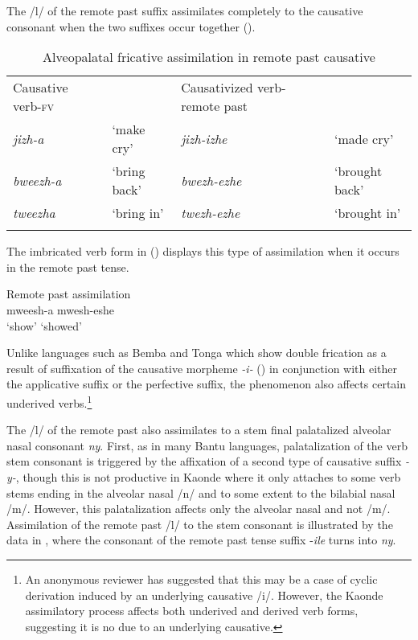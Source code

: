 \documentclass[output=paper]{langsci/langscibook}
\begin{document}
The /l/ of the remote past suffix assimilates completely to the causative consonant when the two suffixes occur together ().


\begin{table}
\begin{tabular}{llll}
\lsptoprule
Causative verb-\textsc{fv} &  & Causativized verb-remote past & \\
\textit{jizh-a} & `make cry' & \textit{jizh-izhe} & `made cry' \\
\textit{bweezh-a} & `bring back' & \textit{bwezh-ezhe} & `brought back' \\
\textit{tweezha} & `bring in' & \textit{twezh-ezhe} & `brought in' \\

\lspbottomrule
\end{tabular}

\caption{Alveopalatal fricative assimilation in remote past causative}
\label{tab:7.kawasha}

 \end{table}


The imbricated verb form in () displays this type of assimilation when it occurs in the remote past tense. 


\ea\label{ex:4.kawasha} Remote past assimilation \\
\gll mweesh-a mwesh-eshe\\
   ‘show’ ‘showed’\\
\glt 
\z


Unlike languages such as Bemba and Tonga which show double frication as a result of suffixation of the causative morpheme \textit{-i-} (\citealt{hyman1995,hyman2003}) in conjunction with either the applicative suffix or the perfective suffix, the phenomenon also affects certain underived verbs.\footnote{An anonymous reviewer has suggested that this may be a case of cyclic derivation induced by an underlying causative /i/. However, the Kaonde assimilatory process affects both underived and derived verb forms, suggesting it is no due to an underlying causative.}

 
The /l/ of the remote past also assimilates to a stem final palatalized alveolar nasal consonant \textit{ny}. First, as in many Bantu languages, palatalization of the verb stem consonant is triggered by the affixation of a second type of causative suffix \textit{-y-}, though this is not productive in Kaonde where it only attaches to some verb stems ending in the alveolar nasal /n/ and to some extent to the bilabial nasal /m/. However, this palatalization affects only the alveolar nasal and not /m/. Assimilation of the remote past /l/ to the stem consonant is illustrated by the data in , where the consonant of the remote past tense suffix -\textit{ile} turns into \textit{ny}.  
 
\end{document}

